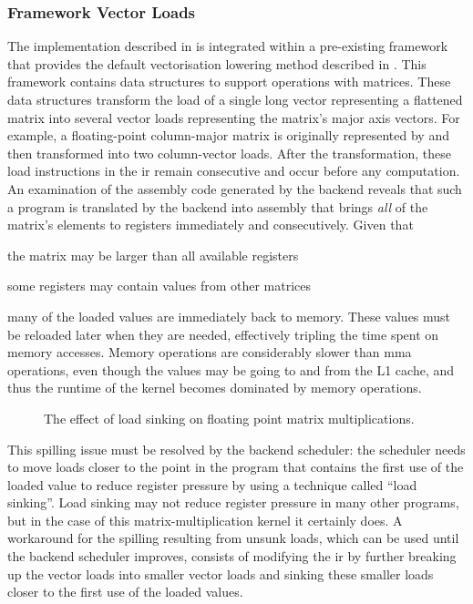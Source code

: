 \documentclass[\main/thesis.tex]{subfiles}
\begin{document}
\subsubsection{Framework Vector Loads}
\label{sec:test}
The implementation described in  is integrated within a pre-existing framework that provides the default vectorisation lowering method described in .
This framework contains data structures to support operations with matrices.
These data structures transform the load of a single long vector representing a flattened matrix into several vector loads representing the matrix's major axis vectors.
For example, a floating-point column-major matrix  is originally represented by  and then transformed into two  column-vector loads.
After the transformation, these load instructions in the \gls{ir} remain consecutive and occur before any computation.
An examination of the assembly code generated by the backend reveals that such a program is translated by the backend into assembly that brings \emph{all} of the matrix's elements to registers immediately and consecutively.
Given that
\begin{enumerate*}[itemjoin={{; }}, itemjoin*={{; and }}, label=(\arabic*), after={,}]
  \item the matrix may be larger than all available registers
  \item some registers may contain values from other matrices
\end{enumerate*}
many of the loaded values are immediately  back to memory.
These values must be reloaded later when they are needed, effectively tripling the time spent on memory accesses.
Memory operations are considerably slower than \gls{mma} operations, even though the values may be going to and from the L1 cache, and thus the runtime of the kernel becomes dominated by memory operations.

\begin{figure}
  \centering
  
  \caption{The effect of load sinking on floating point matrix multiplications.}
  \label{fig:floatSink}
\end{figure}

This spilling issue must be resolved by the backend scheduler\footnotemark: the scheduler needs to move loads closer to the \gls{point} in the program that contains the first use of the loaded value to reduce register pressure by using a technique called ``load sinking''.
Load sinking may not reduce register pressure in many other programs, but in the case of this matrix-multiplication kernel it certainly does.
A workaround for the spilling resulting from unsunk loads, which can be used until the backend scheduler improves, consists of modifying the \gls{ir} by further breaking up the vector loads into smaller vector loads and sinking these smaller loads closer to the first use of the loaded values.
\end{document}
